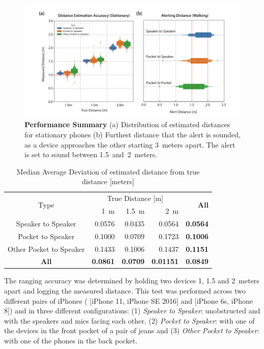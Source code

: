 \documentclass{article}
\begin{document}
\begin{figure}[tb]
    \centering
    \includegraphics[width=\linewidth]{performanceSummary.pdf}
    \caption{\textbf{Performance Summary} (a) Distribution of estimated distances for stationary phones (b) Furthest distance that the alert is sounded, as a device approaches the other starting 3~meters apart. The alert is set to sound between 1.5~and~2~meters.}
    \label{fig:perfSummary}
\end{figure}
\begin{table}[tb]
\centering
\caption{Median Average Deviation of estimated distance from true distance [meters] }
\begin{tabular}{@{}c|rrr|r@{}}
\toprule
\multirow{2}{*}{Type} & \multicolumn{3}{c|}{True Distance [m]} & \multicolumn{1}{r}{\multirow{2}{*}{\textbf{All}}} \\
 & 1~m & 1.5~m & 2~m & \multicolumn{1}{l}{} \\ \midrule
Speaker to Speaker & 0.0576 & 0.0435 & 0.0564 & \textbf{0.0564} \\
Pocket to Speaker & 0.1000 & 0.0709 & 0.1723 & \textbf{0.1006} \\
Other Pocket to Speaker & 0.1433 & 0.1006 & 0.1437 & \textbf{0.1151} \\ \midrule
\textbf{All} & \textbf{0.0861} & \textbf{0.0709} & \textbf{0.01151} & \textbf{0.0849} \\ \bottomrule
\end{tabular}
\label{tbl:accuracy}
\end{table}

The ranging accuracy was determined by holding two devices 1, 1.5 and 2~meters apart and logging the measured distance. This test was performed across two different pairs of iPhones ( [iPhone 11, iPhone SE 2016] and [iPhone 6s, iPhone 8]) and in three different configurations: (1) \emph{Speaker to Speaker}: unobstructed and with the speakers and mics facing each other, (2) \emph{Pocket to Speaker}: with one of the devices in the front pocket of a pair of jeans and (3) \emph{Other Pocket to Speaker}: with one of the phones in the back pocket.
\end{document}
